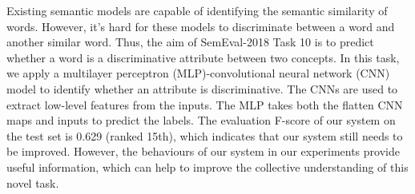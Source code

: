 Existing semantic models are capable of identifying the semantic similarity of words. However, it's hard for these models to discriminate between a word and another similar word. Thus, the aim of SemEval-2018 Task 10 is to predict whether a word is a discriminative attribute between two concepts. In this task, we apply a multilayer perceptron (MLP)-convolutional neural network (CNN) model to identify whether an attribute is discriminative. The CNNs are used to extract low-level features from the inputs. The MLP takes both the flatten CNN maps and inputs to predict the labels. The evaluation F-score of our system on the test set is 0.629 (ranked 15th), which indicates that our system still needs to be improved. However, the behaviours of our system in our experiments provide useful information, which can help to improve the collective understanding of this novel task.
